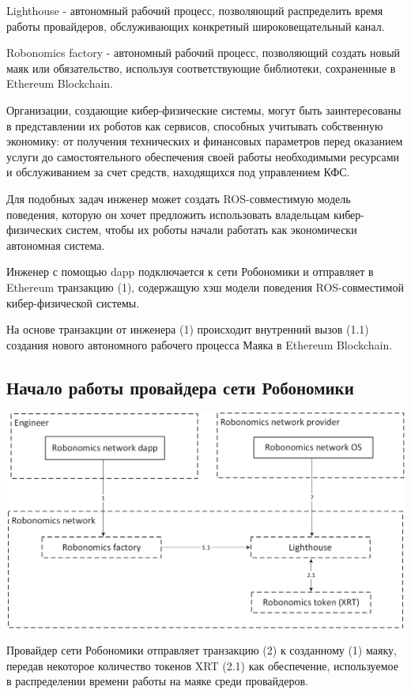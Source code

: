 \documentclass{article}
\begin{document}
Lighthouse - автономный рабочий процесс, позволяющий распределить время работы провайдеров, обслуживающих конкретный широковещательный канал.

Robonomics factory - автономный рабочий процесс, позволяющий создать новый маяк или обязательство, используя соответствующие библиотеки, сохраненные в Ethereum Blockchain.

Организации, создающие кибер-физические системы, могут быть заинтересованы в представлении их роботов как сервисов, способных учитывать собственную экономику: от получения технических и финансовых параметров перед оказанием услуги до самостоятельного обеспечения своей работы необходимыми ресурсами и обслуживанием за счет средств, находящихся под управлением КФС.

Для подобных задач инженер может создать ROS-совместимую модель поведения, которую он хочет предложить использовать владельцам кибер-физических систем, чтобы их роботы начали работать как экономически автономная система.

Инженер с помощью dapp подключается к сети Робономики и отправляет в Ethereum транзакцию (1), содержащую хэш модели поведения ROS-совместимой кибер-физической системы.

На основе транзакции от инженера (1) происходит внутренний вызов (1.1) создания нового автономного рабочего процесса Маяка в Ethereum Blockchain.

\subsection{Начало работы провайдера сети Робономики}

\includegraphics[width=1\textwidth]{step-by-step-2.png}

Провайдер сети Робономики отправляет транзакцию (2) к созданному (1) маяку, передав некоторое количество токенов XRT (2.1) как обеспечение, используемое в распределении времени работы на маяке среди провайдеров.
\end{document}
